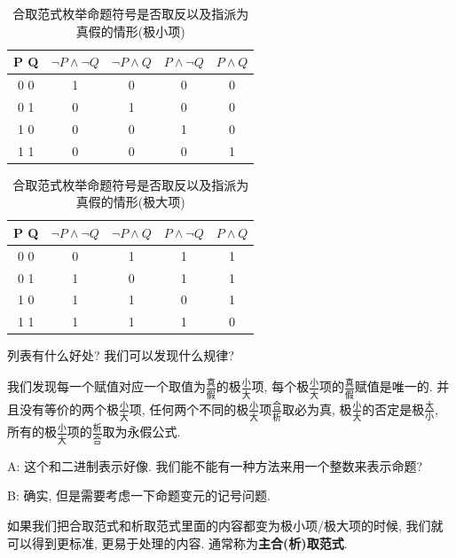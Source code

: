 \begin{table}
	\centering
	\begin{tabular}{|c|c|c|c|c|}
		\hline
		P Q & $\lnot P \land \lnot Q$ & $\lnot P \land  Q$ & $P \land \lnot Q $& $ P \land  Q$\\
		\hline
		0 0 & 1 & 0 & 0 & 0\\
		0 1 & 0 & 1 & 0 & 0\\
		1 0 & 0 & 0 & 1 & 0\\
		1 1 & 0 & 0 & 0 & 1\\
		\hline
	\end{tabular}
	\label{tab:min}
	\caption{合取范式枚举命题符号是否取反以及指派为真假的情形(极小项)}
\end{table}

\begin{table}
	\centering
	\begin{tabular}{|c|c|c|c|c|}
		\hline
		P Q & $\lnot P \land \lnot Q$ & $\lnot P \land  Q$ & $P \land \lnot Q $& $ P \land  Q$\\
		\hline
		0 0 & 0 & 1 & 1 & 1\\
		0 1 & 1 & 0 & 1 & 1\\
		1 0 & 1 & 1 & 0 & 1\\
		1 1 & 1 & 1 & 1 & 0\\
		\hline
	\end{tabular}
	\label{tab:max}
	\caption{合取范式枚举命题符号是否取反以及指派为真假的情形(极大项)}
\end{table}

\begin{bonus}
	列表有什么好处? 我们可以发现什么规律? 
\end{bonus}

我们发现每一个赋值对应一个取值为$\frac{\text{真}}{\text{假}}$的极$\frac{\text{小}}{\text{大}}$项, 每个极$\frac{\text{小}}{\text{大}}$项的$\frac{\text{真}}{\text{假}}$赋值是唯一的. 并且没有等价的两个极$\frac{\text{小}}{\text{大}}$项, 任何两个不同的极$\frac{\text{小}}{\text{大}}$项$\frac{\text{合}}{\text{析}}$取必为真, 极$\frac{\text{小}}{\text{大}}$的否定是极$\frac{\text{大}}{\text{小}}$, 所有的极$\frac{\text{小}}{\text{大}}$项的$\frac{\text{析}}{\text{合}}$取为永假公式. 

\begin{dialogue}
	A: 这个和二进制表示好像. 我们能不能有一种方法来用一个整数来表示命题? 
	
	B: 确实, 但是需要考虑一下命题变元的记号问题. 
\end{dialogue}

如果我们把合取范式和析取范式里面的内容都变为极小项/极大项的时候, 我们就可以得到更标准, 更易于处理的内容. 通常称为\textbf{主合(析)取范式}. 


